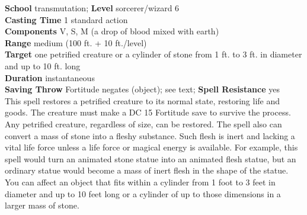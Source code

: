 \textbf{School} transmutation; \textbf{Level} sorcerer/wizard 6\\
\textbf{Casting Time} 1 standard action\\
\textbf{Components} V, S, M (a drop of blood mixed with earth)\\
\textbf{Range }medium (100 ft. + 10 ft./level)\\
\textbf{Target} one petrified creature or a cylinder of stone from 1 ft. to 3 ft. in diameter and up to 10 ft. long\\
\textbf{Duration} instantaneous\\
\textbf{Saving Throw} Fortitude negates (object); see text; \textbf{Spell Resistance} yes\\
This spell restores a petrified creature to its normal state, restoring life and goods. The creature must make a DC 15 Fortitude save to survive the process. Any petrified creature, regardless of size, can be restored. The spell also can convert a mass of stone into a fleshy substance. Such flesh is inert and lacking a vital life force unless a life force or magical energy is available. For example, this spell would turn an animated stone statue into an animated flesh statue, but an ordinary statue would become a mass of inert flesh in the shape of the statue. You can affect an object that fits within a cylinder from 1 foot to 3 feet in diameter and up to 10 feet long or a cylinder of up to those dimensions in a larger mass of stone.\\
